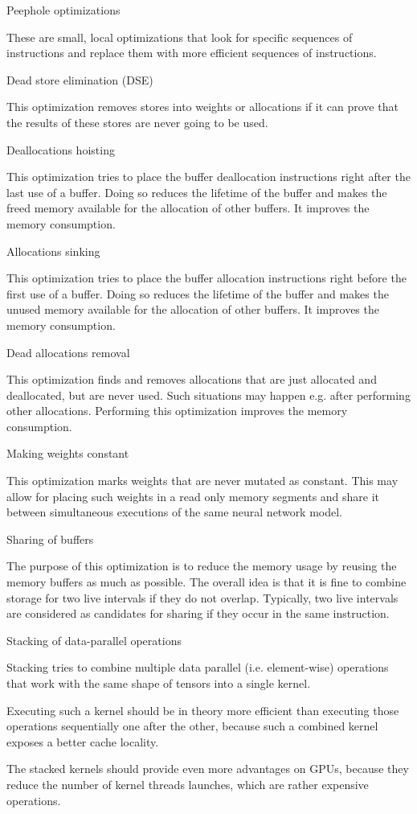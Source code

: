 \begin{DoxyItemize}
\item Peephole optimizations

These are small, local optimizations that look for specific sequences of instructions and replace them with more efficient sequences of instructions.
\item Dead store elimination (D\+SE)

This optimization removes stores into weights or allocations if it can prove that the results of these stores are never going to be used.
\item Deallocations hoisting

This optimization tries to place the buffer deallocation instructions right after the last use of a buffer. Doing so reduces the lifetime of the buffer and makes the freed memory available for the allocation of other buffers. It improves the memory consumption.
\item Allocations sinking

This optimization tries to place the buffer allocation instructions right before the first use of a buffer. Doing so reduces the lifetime of the buffer and makes the unused memory available for the allocation of other buffers. It improves the memory consumption.
\item Dead allocations removal

This optimization finds and removes allocations that are just allocated and deallocated, but are never used. Such situations may happen e.\+g. after performing other allocations. Performing this optimization improves the memory consumption.
\item Making weights constant

This optimization marks weights that are never mutated as constant. This may allow for placing such weights in a read only memory segments and share it between simultaneous executions of the same neural network model.
\item Sharing of buffers

The purpose of this optimization is to reduce the memory usage by reusing the memory buffers as much as possible. The overall idea is that it is fine to combine storage for two live intervals if they do not overlap. Typically, two live intervals are considered as candidates for sharing if they occur in the same instruction.
\item Stacking of data-\/parallel operations

Stacking tries to combine multiple data parallel (i.\+e. element-\/wise) operations that work with the same shape of tensors into a single kernel.

Executing such a kernel should be in theory more efficient than executing those operations sequentially one after the other, because such a combined kernel exposes a better cache locality.

The stacked kernels should provide even more advantages on G\+P\+Us, because they reduce the number of kernel threads launches, which are rather expensive operations. 
\end{DoxyItemize}